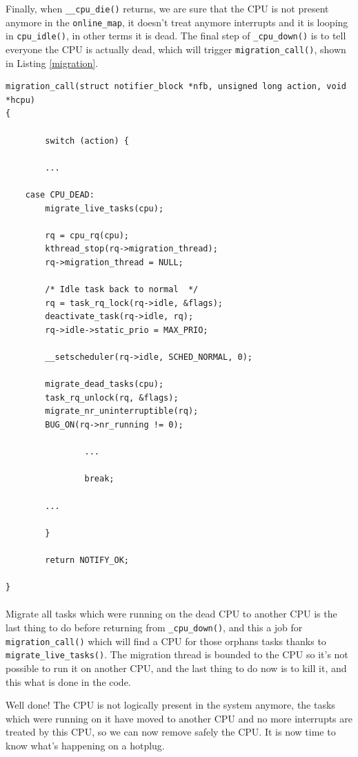 \documentclass{report}
\renewcommand{\tt}[1]{\texttt{{{#1}}}}
\begin{document}
Finally, when \tt{\_\_cpu\_die()} returns, we are sure that the CPU is not
present anymore in the \tt{online\_map}, it doesn't treat anymore
interrupts and it is looping in \tt{cpu\_idle()}, in other terms it is
dead. The final step of \tt{\_cpu\_down()} is to tell everyone the CPU is
actually dead, which will trigger \tt{migration\_call()}, shown in Listing
\ref{migration}.

\begin{lstlisting}[caption=\tt{migration\_call()}{{,}} \tt{kernel/sched.c},label=migration]
migration_call(struct notifier_block *nfb, unsigned long action, void *hcpu)
{

        switch (action) {

        ...

	case CPU_DEAD:
		migrate_live_tasks(cpu);

		rq = cpu_rq(cpu);
		kthread_stop(rq->migration_thread);
		rq->migration_thread = NULL;

		/* Idle task back to normal  */
		rq = task_rq_lock(rq->idle, &flags);
		deactivate_task(rq->idle, rq);
		rq->idle->static_prio = MAX_PRIO;

		__setscheduler(rq->idle, SCHED_NORMAL, 0);

		migrate_dead_tasks(cpu);
		task_rq_unlock(rq, &flags);
		migrate_nr_uninterruptible(rq);
		BUG_ON(rq->nr_running != 0);

                ...

                break;

        ...

        }

        return NOTIFY_OK;

}
\end{lstlisting}

\paragraph{}
Migrate all tasks which were running on the dead CPU to another CPU is the last
thing to do before returning from \tt{\_cpu\_down()}, and this a job for
\tt{migration\_call()} which will find a CPU for those orphans tasks thanks to
\tt{migrate\_live\_tasks()}. The migration thread is bounded to the CPU so it's
not possible to run it on another CPU, and the last thing to do now is to kill
it, and this what is done in the code.

Well done! The CPU is not logically present in the system anymore, the tasks
which were running on it have moved to another CPU and no more interrupts are
treated by this CPU, so we can now remove safely the CPU. It is now time to
know what's happening on a hotplug.
\end{document}
